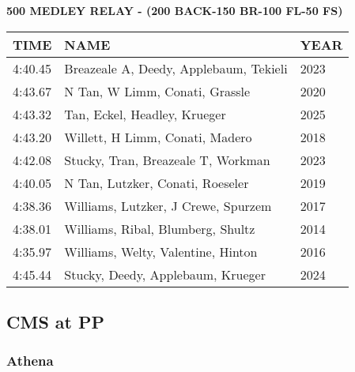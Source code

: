 \begin{center}
\begin{minipage}[t]{0.7\textwidth}
\centering
\textbf{500 MEDLEY RELAY - (200 BACK-150 BR-100 FL-50 FS)}\\[0.05cm]
\begin{tabular}{@{}p{1.8cm}p{2.8cm}p{1.2cm}@{}}
\hline
\textbf{TIME} & \textbf{NAME} & \textbf{YEAR} \\
\hline
4:40.45 & Breazeale A, Deedy, Applebaum, Tekieli & 2023 \\
4:43.67 & N Tan, W Limm, Conati, Grassle & 2020 \\
4:43.32 & Tan, Eckel, Headley, Krueger & 2025 \\
4:43.20 & Willett, H Limm, Conati, Madero & 2018 \\
4:42.08 & Stucky, Tran, Breazeale T, Workman & 2023 \\
4:40.05 & N Tan, Lutzker, Conati, Roeseler & 2019 \\
4:38.36 & Williams, Lutzker, J Crewe, Spurzem & 2017 \\
4:38.01 & Williams, Ribal, Blumberg, Shultz & 2014 \\
4:35.97 & Williams, Welty, Valentine, Hinton & 2016 \\
4:45.44 & Stucky, Deedy, Applebaum, Krueger & 2024 \\
\hline
\end{tabular}
\end{minipage}
\end{center}

\vspace{0.4cm}

\newpage

\subsection{CMS at PP}
\subsubsection{Athena}

